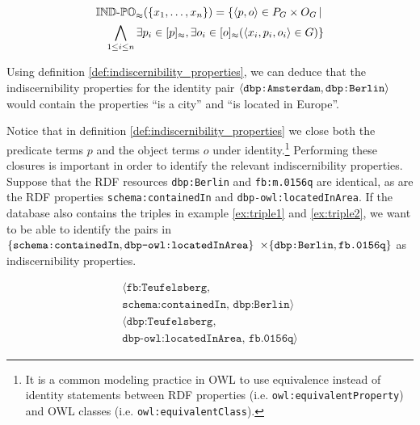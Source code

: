 \begin{definition}
\label{def:indiscernibility_properties}
\begin{align}
  \operatorname{{\mathbb{IND}-\mathbb{PO}}}_{\approx}(\{x_1,\ldots,x_n\})
=
  \{
    \langle p,o\rangle \in P_G \times O_G
  \,\vert\,\nonumber\\
    \bigwedge_{1 \leq i \leq n}
      \exists p_i \in [p]_{\approx},
        \exists o_i \in [o]_{\approx}(
          \langle x_i,p_i,o_i\rangle \in G
        )
  \}\nonumber
\end{align}
\end{definition}

\noindent Using definition \ref{def:indiscernibility_properties},
  we can deduce that the indiscernibility properties for
  the identity pair
  {\small $\langle\texttt{dbp:Amsterdam},\texttt{dbp:Berlin}\rangle$}
  would contain the properties
  ``is a city'' and ``is located in Europe''.

Notice that in definition \ref{def:indiscernibility_properties}
  we close both the predicate terms $p$ and the object terms $o$
  under identity.\footnote{
    It is a common modeling practice in OWL to use equivalence
      instead of identity statements between RDF properties
      (i.e. {\small \texttt{owl:equivalentProperty}})
      and OWL classes
      (i.e. {\small \texttt{owl:equivalentClass}}).
  }
Performing these closures is important in order to identify
  the relevant indiscernibility properties.
Suppose that the RDF resources {\small \texttt{dbp:Berlin}}
  and {\small \texttt{fb:m.0156q}} are identical,
  as are the RDF properties {\small \texttt{schema:containedIn}} and
  {\small \texttt{dbp-owl:locatedInArea}}.
If the database also contains the triples in
  example \ref{ex:triple1} and \ref{ex:triple2},
  we want to be able to identify the pairs in
  {\small $\{\texttt{schema:containedIn},\texttt{dbp-owl:locatedInArea}\}$}
  {\small $\times \{\texttt{dbp:Berlin},\texttt{fb.0156q}\}$}
  as indiscernibility properties.

\small
\begin{example}[Triples]
\begin{align}
\langle
  \texttt{fb:Teufelsberg},\label{ex:triple1}\\
  \texttt{schema:containedIn},\,
  \texttt{dbp:Berlin}
\rangle\nonumber\\
\langle
  \texttt{dbp:Teufelsberg},\label{ex:triple2}\\
  \texttt{dbp-owl:locatedInArea},\,
  \texttt{fb.0156q}
\rangle\nonumber
\end{align}
\end{example}
\normalsize

